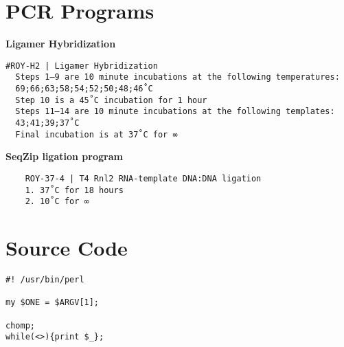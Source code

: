 \section{PCR Programs}\label{apx: PCR Programs}
\textbf{Ligamer Hybridization}
\begin{verbatim}
#ROY-H2 | Ligamer Hybridization
  Steps 1–9 are 10 minute incubations at the following temperatures:
  69;66;63;58;54;52;50;48;46˚C
  Step 10 is a 45˚C incubation for 1 hour
  Steps 11–14 are 10 minute incubations at the following templates:
  43;41;39;37˚C
  Final incubation is at 37˚C for ∞
\end{verbatim}

\textbf{SeqZip ligation program}
\begin{verbatim}
    ROY-37-4 | T4 Rnl2 RNA-template DNA:DNA ligation
    1. 37˚C for 18 hours
    2. 10˚C for ∞
\end{verbatim}

\section{Source Code}\label{apx: Source Code}


\begin{lstlisting}
#! /usr/bin/perl

my $ONE = $ARGV[1];

chomp;
while(<>){print $_};
\end{lstlisting}